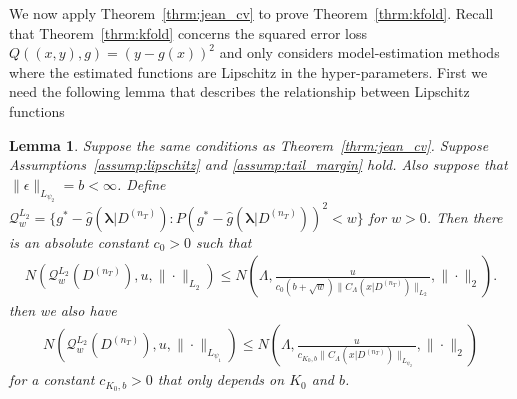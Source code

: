 \documentclass[10pt]{book}
\newtheorem{lemma}{Lemma}
\theoremstyle{definition}
\begin{document}
We now apply Theorem~\ref{thrm:jean_cv} to prove Theorem~\ref{thrm:kfold}.
Recall that Theorem~\ref{thrm:kfold} concerns the squared error loss $Q((x,y), g) = (y - g(x))^2$ and only considers model-estimation methods where the estimated functions are Lipschitz in the hyper-parameters.
First we need the following lemma that describes the relationship between Lipschitz functions
\begin{lemma}
	Suppose the same conditions as Theorem~\ref{thrm:jean_cv}.
	Suppose Assumptions~\ref{assump:lipschitz} and \ref{assump:tail_margin} hold.
	Also suppose that $\|\epsilon\|_{L_{\psi_2}} = b <\infty$.
	Define 
	$\mathcal{Q}_{w}^{L_{2}} = \{g^* - \hat{g}(\boldsymbol{\lambda}|D^{(n_{T})}) : P (g^* - \hat{g}(\boldsymbol{\lambda}|D^{(n_{T})}))^2 < w\}$
	for $w > 0$.
	Then there is an absolute constant $c_0 > 0$ such that
	\begin{align}
	N\left(\mathcal{Q}_{w}^{L_{2}}(D^{(n_{T})}),u,\|\cdot\|_{L_{2}}\right)\le N\left(\Lambda,\frac{u}{c_0 \left(b +\sqrt{w}\right)
		\|C_\Lambda(x|D^{(n_{T})})\|_{L_{2}}},\|\cdot\|_{2}\right).
	\end{align}
	then we also have
	\begin{align}
	N\left(\mathcal{Q}_{w}^{L_{2}}(D^{(n_{T})}),u,\|\cdot\|_{L_{\psi_{1}}}\right)
	\le N\left(
		\Lambda,
		\frac{u}{c_{K_0, b}\|C_\Lambda(x|D^{(n_{T})})\|_{L_{\psi_{2}}}},\|\cdot\|_{2}\right)
	\end{align}
	for a constant $c_{K_0, b} > 0$ that only depends on $K_0$ and $b$.
	\label{lemma:covering_lipschitz}
\end{lemma}
\end{document}
